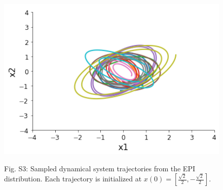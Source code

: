 \documentclass[11pt]{article}
\begin{document}
\begin{figure}
\begin{center}
\includegraphics[scale=0.5]{figures/figS4/figS4.pdf}
\end{center}
\begin{flushleft}
Fig. S3: Sampled dynamical system trajectories from the EPI distribution.  Each trajectory is initialized at $x(0) = [\frac{\sqrt{2}}{2}, -\frac{\sqrt{2}}{2}]$.
\end{flushleft}
\end{figure}
\end{document}
